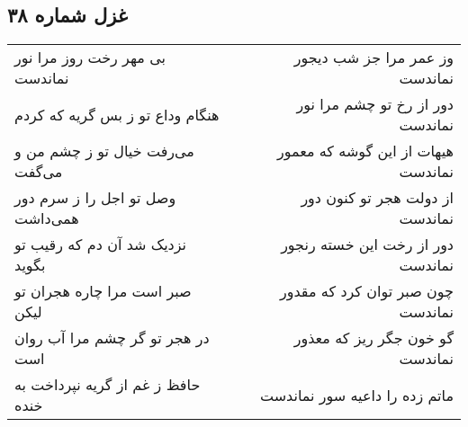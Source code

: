 \begin{center}
\section*{غزل شماره ۳۸}
\label{sec:sh038}
\begin{longtable}{l p{0.5cm} r}
بی مهر رخت روز مرا نور نماندست
&&
وز عمر مرا جز شب دیجور نماندست
\\
هنگام وداع تو ز بس گریه که کردم
&&
دور از رخ تو چشم مرا نور نماندست
\\
می‌رفت خیال تو ز چشم من و می‌گفت
&&
هیهات از این گوشه که معمور نماندست
\\
وصل تو اجل را ز سرم دور همی‌داشت
&&
از دولت هجر تو کنون دور نماندست
\\
نزدیک شد آن دم که رقیب تو بگوید
&&
دور از رخت این خسته رنجور نماندست
\\
صبر است مرا چاره هجران تو لیکن
&&
چون صبر توان کرد که مقدور نماندست
\\
در هجر تو گر چشم مرا آب روان است
&&
گو خون جگر ریز که معذور نماندست
\\
حافظ ز غم از گریه نپرداخت به خنده
&&
ماتم زده را داعیه سور نماندست
\\
\end{longtable}
\end{center}
